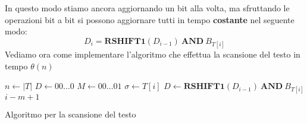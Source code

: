 In questo modo stiamo ancora aggiornando un bit alla volta, ma sfruttando le
operazioni bit a bit si possono aggiornare tutti in tempo \textbf{costante} nel
seguente modo:
\begin{equation}
    D_i = \textbf{RSHIFT1}(D_{i - 1}) \ \textbf{AND} \ B_{T[i]}
\end{equation}
Vediamo ora come implementare l'algoritmo che effettua la scansione del testo in
tempo $\theta(n)$
\begin{algorithm}
    \begin{algorithmic}
        \State $n \gets |T|$
        \State $D \gets 00\dots0$
        \State $M \gets 00\dots01$
        \State $\sigma \gets T[i]$
        \State $D \gets \textbf{RSHIFT1}(D_{i - 1}) \ \textbf{AND} \ B_{T[i]}$
        \State {} $i - m + 1$
        \EndIf
        \EndFor
        \EndFunction
    \end{algorithmic}
    \caption{Algoritmo per la scansione del testo}
\end{algorithm}
